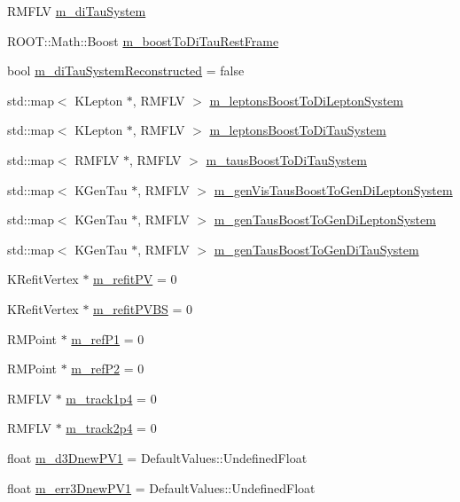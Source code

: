 \begin{DoxyCompactItemize}
\item 
RMFLV \hyperlink{classHttProduct_aeda613181415aa218fe0cacc9bb3e7a5}{m\_\-diTauSystem}
\item 
ROOT::Math::Boost \hyperlink{classHttProduct_ac7288a01a3f35dc7b5ef2d0b4c713cd8}{m\_\-boostToDiTauRestFrame}
\item 
bool \hyperlink{classHttProduct_a74732bcc7098f15e0bcca4c01e5738f9}{m\_\-diTauSystemReconstructed} = false
\item 
std::map$<$ KLepton $\ast$, RMFLV $>$ \hyperlink{classHttProduct_a92352e3b04bf6249535bf5f02aef3193}{m\_\-leptonsBoostToDiLeptonSystem}
\item 
std::map$<$ KLepton $\ast$, RMFLV $>$ \hyperlink{classHttProduct_ac52a68f17b8c456a8dc7a23ca8c35926}{m\_\-leptonsBoostToDiTauSystem}
\item 
std::map$<$ RMFLV $\ast$, RMFLV $>$ \hyperlink{classHttProduct_aea1e343fbe03ad6d80b4390c49592699}{m\_\-tausBoostToDiTauSystem}
\item 
std::map$<$ KGenTau $\ast$, RMFLV $>$ \hyperlink{classHttProduct_ad51c5ccec06913d5eb09f11bc42bbce5}{m\_\-genVisTausBoostToGenDiLeptonSystem}
\item 
std::map$<$ KGenTau $\ast$, RMFLV $>$ \hyperlink{classHttProduct_aad0006f795c69ebf4010459418693721}{m\_\-genTausBoostToGenDiLeptonSystem}
\item 
std::map$<$ KGenTau $\ast$, RMFLV $>$ \hyperlink{classHttProduct_ac04d1f87583b1228a755735133e53bf6}{m\_\-genTausBoostToGenDiTauSystem}
\item 
KRefitVertex $\ast$ \hyperlink{classHttProduct_a2e67ba21921d25e857e5265bf53fa1b8}{m\_\-refitPV} = 0
\item 
KRefitVertex $\ast$ \hyperlink{classHttProduct_a059310143e55e578c6f0ec5613e79ca6}{m\_\-refitPVBS} = 0
\item 
RMPoint $\ast$ \hyperlink{classHttProduct_a485baa2ac1d1ecbdb55366c9865d27fe}{m\_\-refP1} = 0
\item 
RMPoint $\ast$ \hyperlink{classHttProduct_adc963cf8394312ce7d86c8ae53f0c6cd}{m\_\-refP2} = 0
\item 
RMFLV $\ast$ \hyperlink{classHttProduct_a6316ad75d22057f3a6405904144e3307}{m\_\-track1p4} = 0
\item 
RMFLV $\ast$ \hyperlink{classHttProduct_a8a6f0088a1ba7e9838e0b2f9b551bce5}{m\_\-track2p4} = 0
\item 
float \hyperlink{classHttProduct_a7ceef9ded23ad83000f89af8167cd962}{m\_\-d3DnewPV1} = DefaultValues::UndefinedFloat
\item 
float \hyperlink{classHttProduct_afb1ebfc82910386b745aef7f8dc897c0}{m\_\-err3DnewPV1} = DefaultValues::UndefinedFloat

\end{DoxyCompactItemize}
